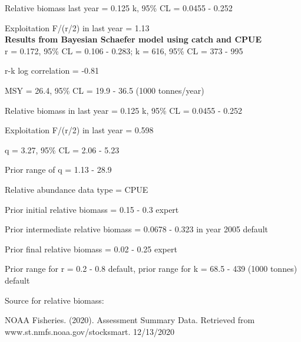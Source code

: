 \documentclass[12pt,a4paper]{article}\usepackage[]{graphicx}\usepackage[]{xcolor}
\begin{document}
Relative biomass last year = 0.125 k, 95\% CL = 0.0455 - 0.252

Exploitation F/(r/2) in last year = 1.13 \\

\textbf{Results from Bayesian Schaefer model using catch and CPUE}\\

r = 0.172, 95\% CL = 0.106 - 0.283; k = 616, 95\% CL = 373 - 995

r-k log correlation = -0.81

MSY = 26.4, 95\% CL = 19.9 - 36.5 (1000 tonnes/year)

Relative biomass in last year = 0.125 k, 95\% CL = 0.0455 - 0.252

Exploitation F/(r/2) in last year = 0.598

q = 3.27, 95\% CL = 2.06 - 5.23

Prior range of q = 1.13 - 28.9

Relative abundance data type = CPUE

Prior initial relative biomass = 0.15 - 0.3 expert

Prior intermediate relative biomass = 0.0678 - 0.323 in year 2005 default

Prior final relative biomass = 0.02 - 0.25 expert

Prior range for r = 0.2 - 0.8 default, prior range for k = 68.5 - 439 (1000 tonnes) default

Source for relative biomass: 

NOAA Fisheries. (2020). Assessment Summary Data. Retrieved from www.st.nmfs.noaa.gov/stocksmart. 12/13/2020

    
\end{document}
